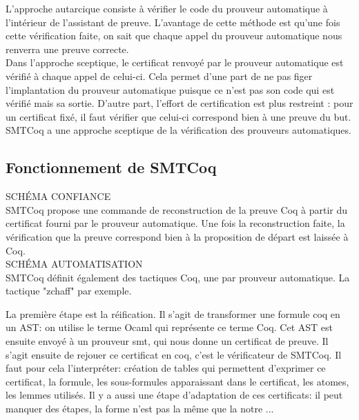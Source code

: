 \documentclass{article}
\begin{document}
L'approche autarcique consiste à vérifier le code du prouveur automatique à l'intérieur de l'assistant de preuve. L'avantage de cette méthode est qu'une fois cette vérification faite, on sait que chaque appel du prouveur automatique nous renverra une preuve correcte. \\

Dans l'approche sceptique, le certificat renvoyé par le prouveur automatique est vérifié à chaque appel de celui-ci. Cela permet d'une part de ne pas figer l'implantation du prouveur automatique puisque ce n'est pas son code qui est vérifié mais sa sortie. D'autre part, l'effort de certification est plus restreint : pour un certificat fixé, il faut vérifier que celui-ci correspond bien à une preuve du but.\\

SMTCoq a une approche sceptique de la vérification des prouveurs automatiques.

\subsection{Fonctionnement de SMTCoq}

SCHÉMA CONFIANCE \\

SMTCoq propose une commande de reconstruction de la preuve Coq à partir du certificat fourni par le prouveur automatique. Une fois la reconstruction faite, la vérification que la preuve correspond bien à la proposition de départ est laissée à Coq. \\


SCHÉMA AUTOMATISATION \\

SMTCoq définit également des tactiques Coq, une par prouveur automatique. La tactique "zchaff" par exemple. 

La première étape est la réification. Il s'agit de transformer une formule coq en un AST:
on utilise le terme Ocaml qui représente ce terme Coq.
Cet AST est ensuite envoyé à un prouveur smt, qui nous donne un certificat de preuve.
Il s'agit ensuite de rejouer ce certificat en coq, c'est le vérificateur de SMTCoq.
Il faut pour cela l'interpréter: création de tables qui permettent d'exprimer ce certificat, la formule, les sous-formules apparaissant
dans le certificat, les atomes, les lemmes utilisés. Il y a aussi une étape d'adaptation de ces certificats: il peut manquer des étapes, la forme n'est pas la même que la notre ... \\
\end{document}
